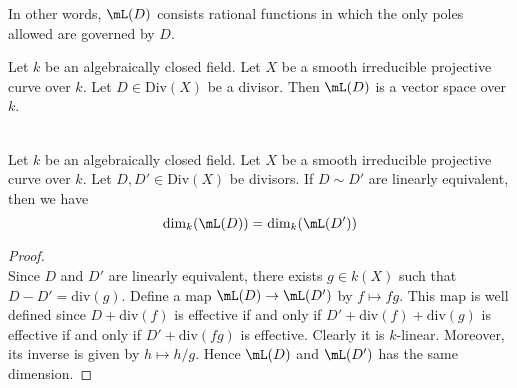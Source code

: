 \documentclass[a4paper]{article}
\begin{document}
In other words, $\mL(D)$ consists rational functions in which the only poles allowed are governed by $D$. 

\begin{lmm}{}{} Let $k$ be an algebraically closed field. Let $X$ be a smooth irreducible projective curve over $k$. Let $D\in\text{Div}(X)$ be a divisor. Then $\mL(D)$ is a vector space over $k$. 
\end{lmm}

\begin{prp}{}{}\\
Let $k$ be an algebraically closed field. Let $X$ be a smooth irreducible projective curve over $k$. Let $D,D'\in\text{Div}(X)$ be divisors. If $D\sim D'$ are linearly equivalent, then we have $$\dim_k(\mL(D))=\dim_k(\mL(D'))$$
\begin{proof}\\
Since $D$ and $D'$ are linearly equivalent, there exists $g\in k(X)$ such that $D-D'=\text{div}(g)$. Define a map $\mL(D)\to\mL(D')$ by $f\mapsto fg$. This map is well defined since $D+\text{div}(f)$ is effective if and only if $D'+\text{div}(f)+\text{div}(g)$ is effective if and only if $D'+\text{div}(fg)$ is effective. Clearly it is $k$-linear. Moreover, its inverse is given by $h\mapsto h/g$. Hence $\mL(D)$ and $\mL(D')$ has the same dimension. 
\end{proof}
\end{prp}
\end{document}
